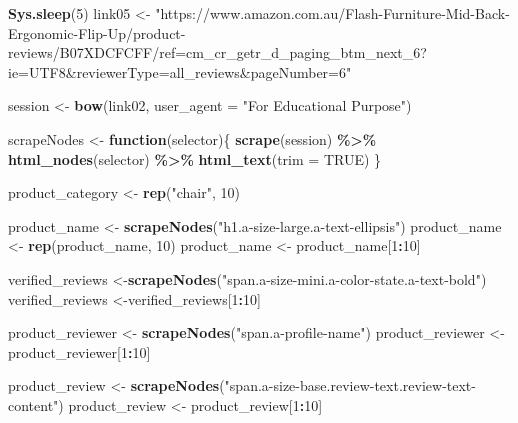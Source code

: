 \documentclass[
]{article}
\newenvironment{Shaded}{\begin{snugshade}}{\end{snugshade}}
\newcommand{\AttributeTok}[1]{\textcolor[rgb]{0.13,0.29,0.53}{#1}}
\newcommand{\ConstantTok}[1]{\textcolor[rgb]{0.56,0.35,0.01}{#1}}
\newcommand{\ControlFlowTok}[1]{\textcolor[rgb]{0.13,0.29,0.53}{\textbf{#1}}}
\newcommand{\DecValTok}[1]{\textcolor[rgb]{0.00,0.00,0.81}{#1}}
\newcommand{\FunctionTok}[1]{\textcolor[rgb]{0.13,0.29,0.53}{\textbf{#1}}}
\newcommand{\NormalTok}[1]{#1}
\newcommand{\OtherTok}[1]{\textcolor[rgb]{0.56,0.35,0.01}{#1}}
\newcommand{\SpecialCharTok}[1]{\textcolor[rgb]{0.81,0.36,0.00}{\textbf{#1}}}
\newcommand{\StringTok}[1]{\textcolor[rgb]{0.31,0.60,0.02}{#1}}
\begin{document}
\begin{Shaded}
\begin{Highlighting}[]
   \FunctionTok{Sys.sleep}\NormalTok{(}\DecValTok{5}\NormalTok{)}
\NormalTok{link05 }\OtherTok{\textless{}{-}} \StringTok{"https://www.amazon.com.au/Flash{-}Furniture{-}Mid{-}Back{-}Ergonomic{-}Flip{-}Up/product{-}reviews/B07XDCFCFF/ref=cm\_cr\_getr\_d\_paging\_btm\_next\_6?ie=UTF8\&reviewerType=all\_reviews\&pageNumber=6"}


\NormalTok{  session }\OtherTok{\textless{}{-}} \FunctionTok{bow}\NormalTok{(link02,}
               \AttributeTok{user\_agent =} \StringTok{"For Educational Purpose"}\NormalTok{)}

\NormalTok{  scrapeNodes }\OtherTok{\textless{}{-}} \ControlFlowTok{function}\NormalTok{(selector)\{}
    \FunctionTok{scrape}\NormalTok{(session) }\SpecialCharTok{\%\textgreater{}\%}
      \FunctionTok{html\_nodes}\NormalTok{(selector) }\SpecialCharTok{\%\textgreater{}\%}
      \FunctionTok{html\_text}\NormalTok{(}\AttributeTok{trim =} \ConstantTok{TRUE}\NormalTok{)}
\NormalTok{  \}}

\NormalTok{  product\_category }\OtherTok{\textless{}{-}} \FunctionTok{rep}\NormalTok{(}\StringTok{"chair"}\NormalTok{, }\DecValTok{10}\NormalTok{)}

\NormalTok{  product\_name }\OtherTok{\textless{}{-}} \FunctionTok{scrapeNodes}\NormalTok{(}\StringTok{"h1.a{-}size{-}large.a{-}text{-}ellipsis"}\NormalTok{)}
\NormalTok{  product\_name }\OtherTok{\textless{}{-}} \FunctionTok{rep}\NormalTok{(product\_name, }\DecValTok{10}\NormalTok{)}
\NormalTok{  product\_name }\OtherTok{\textless{}{-}}\NormalTok{ product\_name[}\DecValTok{1}\SpecialCharTok{:}\DecValTok{10}\NormalTok{]}
  
\NormalTok{  verified\_reviews }\OtherTok{\textless{}{-}}\FunctionTok{scrapeNodes}\NormalTok{(}\StringTok{"span.a{-}size{-}mini.a{-}color{-}state.a{-}text{-}bold"}\NormalTok{)}
\NormalTok{  verified\_reviews }\OtherTok{\textless{}{-}}\NormalTok{verified\_reviews[}\DecValTok{1}\SpecialCharTok{:}\DecValTok{10}\NormalTok{]}
  
\NormalTok{  product\_reviewer }\OtherTok{\textless{}{-}} \FunctionTok{scrapeNodes}\NormalTok{(}\StringTok{"span.a{-}profile{-}name"}\NormalTok{)}
\NormalTok{  product\_reviewer }\OtherTok{\textless{}{-}}\NormalTok{ product\_reviewer[}\DecValTok{1}\SpecialCharTok{:}\DecValTok{10}\NormalTok{]}
  
\NormalTok{  product\_review }\OtherTok{\textless{}{-}} \FunctionTok{scrapeNodes}\NormalTok{(}\StringTok{"span.a{-}size{-}base.review{-}text.review{-}text{-}content"}\NormalTok{)}
\NormalTok{  product\_review }\OtherTok{\textless{}{-}}\NormalTok{ product\_review[}\DecValTok{1}\SpecialCharTok{:}\DecValTok{10}\NormalTok{]}
  

\end{Highlighting}
\end{Shaded}
\end{document}
